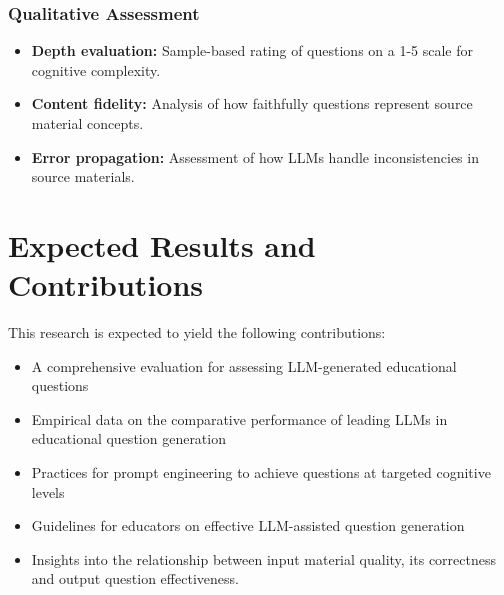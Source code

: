 \documentclass[12pt]{article}
\begin{document}
\subsubsection{Qualitative Assessment}
\begin{itemize}
    \item \textbf{Depth evaluation:} Sample-based rating of questions on a 1-5 scale for cognitive complexity.
    \item \textbf{Content fidelity:} Analysis of how faithfully questions represent source material concepts.
    \item \textbf{Error propagation:} Assessment of how LLMs handle inconsistencies in source materials.
\end{itemize}

\section{Expected Results and Contributions}
This research is expected to yield the following contributions:

\begin{itemize}
    \item A comprehensive evaluation for assessing LLM-generated educational questions
    \item Empirical data on the comparative performance of leading LLMs in educational question generation
    \item Practices for prompt engineering to achieve questions at targeted cognitive levels
    \item Guidelines for educators on effective LLM-assisted question generation
    \item Insights into the relationship between input material quality, its correctness and output question effectiveness.
\end{itemize}
\end{document}
